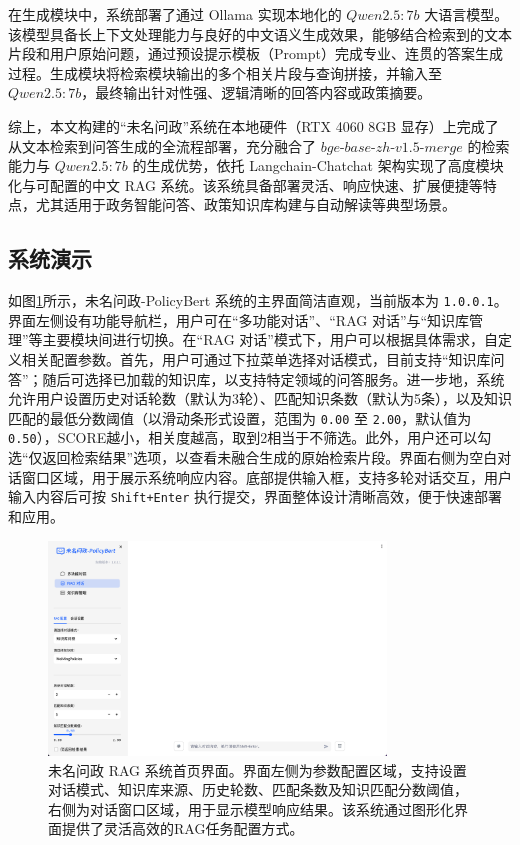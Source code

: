 \documentclass[12pt, a4paper]{ctexart}
\begin{document}
在生成模块中，系统部署了通过 Ollama 实现本地化的 $Qwen2.5:7b$ 大语言模型。该模型具备长上下文处理能力与良好的中文语义生成效果，能够结合检索到的文本片段和用户原始问题，通过预设提示模板（Prompt）完成专业、连贯的答案生成过程。生成模块将检索模块输出的多个相关片段与查询拼接，并输入至 $Qwen2.5:7b$，最终输出针对性强、逻辑清晰的回答内容或政策摘要。

综上，本文构建的“未名问政”系统在本地硬件（RTX 4060 8GB 显存）上完成了从文本检索到问答生成的全流程部署，充分融合了 $bge\text{-}base\text{-}zh\text{-}v1.5\text{-}merge$ 的检索能力与 $Qwen2.5:7b$ 的生成优势，依托 Langchain-Chatchat 架构实现了高度模块化与可配置的中文 RAG 系统。该系统具备部署灵活、响应快速、扩展便捷等特点，尤其适用于政务智能问答、政策知识库构建与自动解读等典型场景。

\subsection{系统演示}
如图\ref{fig:home_page}所示，未名问政-PolicyBert 系统的主界面简洁直观，当前版本为 \texttt{1.0.0.1}。界面左侧设有功能导航栏，用户可在“多功能对话”、“RAG 对话”与“知识库管理”等主要模块间进行切换。在“RAG 对话”模式下，用户可以根据具体需求，自定义相关配置参数。首先，用户可通过下拉菜单选择对话模式，目前支持“知识库问答”；随后可选择已加载的知识库，以支持特定领域的问答服务。进一步地，系统允许用户设置历史对话轮数（默认为3轮）、匹配知识条数（默认为5条），以及知识匹配的最低分数阈值（以滑动条形式设置，范围为 \texttt{0.00} 至 \texttt{2.00}，默认值为 \texttt{0.50}），SCORE越小，相关度越高，取到2相当于不筛选。此外，用户还可以勾选“仅返回检索结果”选项，以查看未融合生成的原始检索片段。界面右侧为空白对话窗口区域，用于展示系统响应内容。底部提供输入框，支持多轮对话交互，用户输入内容后可按 \texttt{Shift+Enter} 执行提交，界面整体设计清晰高效，便于快速部署和应用。
\begin{figure}[H]
    \centering
    \includegraphics[width=0.8\textwidth]{./images/home_page.png}
    \caption{未名问政 RAG 系统首页界面。界面左侧为参数配置区域，支持设置对话模式、知识库来源、历史轮数、匹配条数及知识匹配分数阈值，右侧为对话窗口区域，用于显示模型响应结果。该系统通过图形化界面提供了灵活高效的RAG任务配置方式。}
    \label{fig:home_page}
\end{figure}
\end{document}
